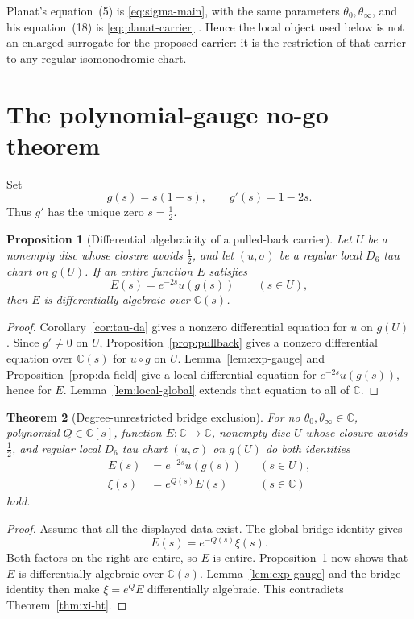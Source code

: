 \documentclass[11pt]{article}
\numberwithin{equation}{section}
\newtheorem{theorem}{Theorem}[section]
\newtheorem{proposition}[theorem]{Proposition}
\theoremstyle{definition}
\theoremstyle{remark}
\newcommand{\C}{\mathbb C}
\begin{document}
Planat's equation~(5) is \eqref{eq:sigma-main}, with the same parameters
$\theta_0,\theta_\infty$, and his equation~(18) is \eqref{eq:planat-carrier}
\cite{Planat2026}.  Hence the local object used below is not an enlarged surrogate for the
proposed carrier: it is the restriction of that carrier to any regular isomonodromic chart.

\section{The polynomial-gauge no-go theorem}
\label{sec:nogo}

Set
\[
 g(s)=s(1-s),
 \qquad g'(s)=1-2s.
\]
Thus $g'$ has the unique zero $s=\tfrac12$.

\begin{proposition}[Differential algebraicity of a pulled-back carrier]
\label{prop:carrier-da}
Let $U$ be a nonempty disc whose closure avoids $\tfrac12$, and let $(u,\sigma)$ be a regular
local $D_6$ tau chart on $g(U)$.  If an entire function $E$ satisfies
\[
 E(s)=e^{-2s}u(g(s))\qquad(s\in U),
\]
then $E$ is differentially algebraic over $\C(s)$.
\end{proposition}

\begin{proof}
Corollary~\ref{cor:tau-da} gives a nonzero differential equation for $u$ on $g(U)$.  Since
$g'\neq0$ on $U$, Proposition~\ref{prop:pullback} gives a nonzero differential equation over
$\C(s)$ for $u\circ g$ on $U$.  Lemma~\ref{lem:exp-gauge} and
Proposition~\ref{prop:da-field} give a local differential equation for
$e^{-2s}u(g(s))$, hence for $E$.  Lemma~\ref{lem:local-global} extends that equation to all of
$\C$.
\end{proof}

\begin{theorem}[Degree-unrestricted bridge exclusion]
\label{thm:main}
For no $\theta_0,\theta_\infty\in\C$, polynomial $Q\in\C[s]$, function $E:\C\to\C$, nonempty
disc $U$ whose closure avoids $\tfrac12$, and regular local $D_6$ tau chart $(u,\sigma)$ on $g(U)$
do both
identities
\begin{align*}
 E(s)&=e^{-2s}u(g(s)) &&(s\in U),\\
 \xi(s)&=e^{Q(s)}E(s) &&(s\in\C)
\end{align*}
hold.
\end{theorem}

\begin{proof}
Assume that all the displayed data exist.  The global bridge identity gives
\begin{equation}
 E(s)=e^{-Q(s)}\xi(s).
 \label{eq:E-entire}
\end{equation}
Both factors on the right are entire, so $E$ is entire.  Proposition~\ref{prop:carrier-da} now
shows that $E$ is differentially algebraic over $\C(s)$.  Lemma~\ref{lem:exp-gauge} and the bridge
identity then make $\xi=e^QE$ differentially algebraic.  This contradicts
Theorem~\ref{thm:xi-ht}.
\end{proof}
\end{document}
